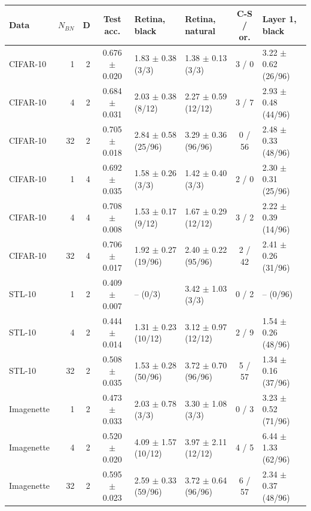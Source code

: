 \begin{tabular}{lrrcllcl}
\toprule
Data & $N_{BN}$ & D & Test acc. & Retina, black & Retina, natural & C-S / or. & Layer 1, black \\
\midrule
CIFAR-10 & 1 & 2 & 0.676 $\pm$ 0.020 & 1.83 $\pm$ 0.38 (3/3) & 1.38 $\pm$ 0.13 (3/3) & 3 / 0 & 3.22 $\pm$ 0.62 (26/96) \\
CIFAR-10 & 4 & 2 & 0.684 $\pm$ 0.031 & 2.03 $\pm$ 0.38 (8/12) & 2.27 $\pm$ 0.59 (12/12) & 3 / 7 & 2.93 $\pm$ 0.48 (44/96) \\
CIFAR-10 & 32 & 2 & 0.705 $\pm$ 0.018 & 2.84 $\pm$ 0.58 (25/96) & 3.29 $\pm$ 0.36 (96/96) & 0 / 56 & 2.48 $\pm$ 0.33 (48/96) \\
CIFAR-10 & 1 & 4 & 0.692 $\pm$ 0.035 & 1.58 $\pm$ 0.26 (3/3) & 1.42 $\pm$ 0.40 (3/3) & 2 / 0 & 2.30 $\pm$ 0.31 (25/96) \\
CIFAR-10 & 4 & 4 & 0.708 $\pm$ 0.008 & 1.53 $\pm$ 0.17 (9/12) & 1.67 $\pm$ 0.29 (12/12) & 3 / 2 & 2.22 $\pm$ 0.39 (14/96) \\
CIFAR-10 & 32 & 4 & 0.706 $\pm$ 0.017 & 1.92 $\pm$ 0.27 (19/96) & 2.40 $\pm$ 0.22 (95/96) & 2 / 42 & 2.41 $\pm$ 0.26 (31/96) \\
STL-10 & 1 & 2 & 0.409 $\pm$ 0.007 & -- (0/3) & 3.42 $\pm$ 1.03 (3/3) & 0 / 2 & -- (0/96) \\
STL-10 & 4 & 2 & 0.444 $\pm$ 0.014 & 1.31 $\pm$ 0.23 (10/12) & 3.12 $\pm$ 0.97 (12/12) & 2 / 9 & 1.54 $\pm$ 0.26 (48/96) \\
STL-10 & 32 & 2 & 0.508 $\pm$ 0.035 & 1.53 $\pm$ 0.28 (50/96) & 3.72 $\pm$ 0.70 (96/96) & 5 / 57 & 1.34 $\pm$ 0.16 (37/96) \\
Imagenette & 1 & 2 & 0.473 $\pm$ 0.033 & 2.03 $\pm$ 0.78 (3/3) & 3.30 $\pm$ 1.08 (3/3) & 0 / 3 & 3.23 $\pm$ 0.52 (71/96) \\
Imagenette & 4 & 2 & 0.520 $\pm$ 0.020 & 4.09 $\pm$ 1.57 (10/12) & 3.97 $\pm$ 2.11 (12/12) & 4 / 5 & 6.44 $\pm$ 1.33 (62/96) \\
Imagenette & 32 & 2 & 0.595 $\pm$ 0.023 & 2.59 $\pm$ 0.33 (59/96) & 3.72 $\pm$ 0.64 (96/96) & 6 / 57 & 2.34 $\pm$ 0.37 (48/96) \\
\bottomrule
\end{tabular}
